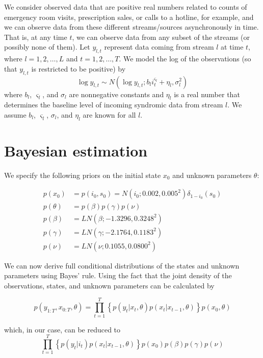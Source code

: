 \documentclass{article}
\begin{document}
We consider observed data that are positive real numbers related to counts of emergency room visits, prescription sales, or calls to a hotline, for example, and we can observe data from these different streams/sources asynchronously in time. That is, at any time $t$, we can observe data from any subset of the streams (or possibly none of them). Let $y_{l,t}$ represent data coming from stream $l$ at time $t$, where $l = 1,2,\ldots,L$ and $t = 1,2,\ldots,T$. We model the log of the observations (so that $y_{l,t}$ is restricted to be positive) by
\begin{equation}
\log y_{l,t} \sim N\left(\log y_{l,t};b_li_t^{\varsigma_l} + \eta_l,\sigma_l^2\right) \label{eqn:obs}
\end{equation}
where $b_l$, $\varsigma_l$, and $\sigma_l$ are nonnegative constants and $\eta_l$ is a real number that determines the baseline level of incoming syndromic data from stream $l$. We assume $b_l$, $\varsigma_l$, $\sigma_l$, and $\eta_l$ are known for all $l$.

\section{Bayesian estimation}

We specify the following priors on the initial state $x_0$ and unknown parameters $\theta$:

\begin{align*}
p(x_0) &= p(i_0,s_0) = N(i_0;0.002,0.005^2)\delta_{1 - i_0}(s_0) \\
p(\theta) &= p(\beta)p(\gamma)p(\nu) \\
p(\beta) &= LN(\beta;-1.3296,0.3248^2) \\
p(\gamma) &= LN(\gamma;-2.1764,0.1183^2) \\
p(\nu) &= LN(\nu;0.1055,0.0800^2)
\end{align*}

We can now derive full conditional distributions of the states and unknown parameters using Bayes' rule. Using the fact that the joint density of the observations, states, and unknown parameters can be calculated by

\begin{equation}
p(y_{1:T},x_{0:T},\theta) = \prod_{t = 1}^T \left\{p(y_t|x_t,\theta)p(x_t|x_{t-1},\theta)\right\}p(x_0,\theta) \label{eqn:joint}
\end{equation}

\noindent which, in our case, can be reduced to
\[\prod_{t = 1}^T \left\{p(y_t|i_t)p(x_t|x_{t-1},\theta)\right\}p(x_0)p(\beta)p(\gamma)p(\nu)\]
\end{document}
